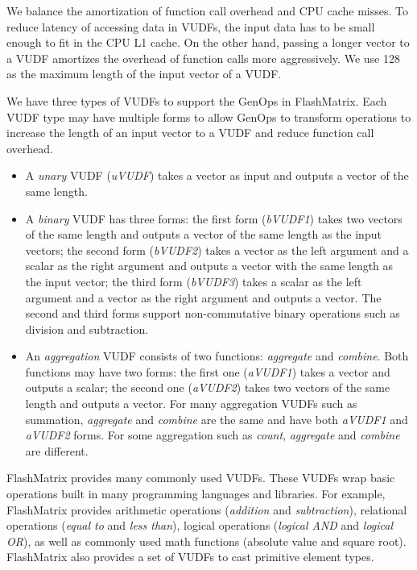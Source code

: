 We balance the amortization of function call overhead and CPU cache misses.
To reduce latency of accessing data in VUDFs,
the input data has to be small enough to fit in the CPU L1 cache. On the
other hand, passing a longer vector to a VUDF amortizes the overhead of
function calls more aggressively. We use 128 as the maximum length of
the input vector of a VUDF. %

We have three types of VUDFs to support the GenOps in FlashMatrix. Each VUDF
type may have multiple forms to allow GenOps to transform operations to
increase the length of an input vector to a VUDF and reduce function call
overhead.
\begin{itemize}
	\item A \textit{unary} VUDF (\textit{uVUDF}) takes a vector
		as input and outputs a vector of the same length.
	\item A \textit{binary} VUDF has three forms: the first form (\textit{bVUDF1}) 
    takes two vectors of the same length and outputs
		a vector of the same length as the input vectors; the second form (\textit{bVUDF2}) 
    takes a vector as the left argument and a scalar
		as the right argument and outputs a vector with the same length as
		the input vector; the third form (\textit{bVUDF3}) takes a scalar
		as the left argument and a vector as the right argument and outputs
		a vector. The second and third forms support non-commutative binary
		operations such as division and subtraction.
	\item An \textit{aggregation} VUDF consists of two functions:
		\textit{aggregate} and \textit{combine}. Both functions may have two
		forms: the first one (\textit{aVUDF1}) takes a vector and
		outputs a scalar; the second one (\textit{aVUDF2}) takes
		two vectors of the same length and outputs a vector. For many
		aggregation VUDFs such as summation, \textit{aggregate} and
		\textit{combine} are the same and have both \textit{aVUDF1} and
		\textit{aVUDF2} forms. For some aggregation such as \textit{count},
		\textit{aggregate} and \textit{combine} are different.
\end{itemize}

FlashMatrix provides many commonly used VUDFs. These VUDFs wrap
basic operations built in many programming languages and libraries. For example,
FlashMatrix provides arithmetic operations (\textit{addition} and
\textit{subtraction}), relational operations (\textit{equal to} and
\textit{less than}), logical operations (\textit{logical AND} and
\textit{logical OR}), as well as commonly used math functions (absolute value and square root). 
FlashMatrix also provides a set of VUDFs to
cast primitive element types.

